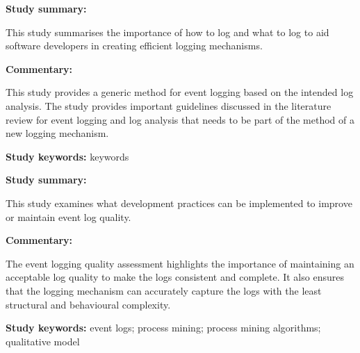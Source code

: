 \begin{tcolorbox}[colback=gray!5!white, colframe=deepblue!80!black, title=Learning to Log: Helping Developers Make Informed Logging Decisions \cite{Zhu2015}]
	\begin{minipage}[t]{0.25\textwidth}
		\textbf{Study summary:}
	\end{minipage}
	\hfill
	\begin{minipage}[t]{0.65\textwidth}
		This study summarises the importance of how to log and what to log to aid software developers in creating efficient logging mechanisms. 
	\end{minipage}

	\vspace{0.75em} 

	\begin{minipage}[t]{0.25\textwidth}
		\textbf{Commentary:}
	\end{minipage}
	\hfill
	\begin{minipage}[t]{0.65\textwidth}
		This study provides a generic method for event logging based on the intended log analysis. The study provides important guidelines discussed in the literature review for event logging and log analysis that needs to be part of the method of a new logging mechanism.
	\end{minipage}
	\tcblower
	\textbf{Study keywords:} keywords
\end{tcolorbox}

\begin{tcolorbox}[colback=gray!5!white, colframe=deepblue!80!black, title=Towards a better assessment of event logs quality\cite{Kherbouche2017}]
	\begin{minipage}[t]{0.25\textwidth}
		\textbf{Study summary:}
	\end{minipage}
	\hfill
	\begin{minipage}[t]{0.65\textwidth}
		This study examines what development practices can be implemented to improve or maintain event log quality.
	\end{minipage}

	\vspace{0.75em} 

	\begin{minipage}[t]{0.25\textwidth}
		\textbf{Commentary:}
	\end{minipage}
	\hfill
	\begin{minipage}[t]{0.65\textwidth}
		The event logging quality assessment highlights the importance of maintaining an acceptable log quality to make the logs consistent and complete. It also ensures that the logging mechanism can accurately capture the logs with the least structural and behavioural complexity. 
	\end{minipage}
	\tcblower
	\textbf{Study keywords:} event logs; process mining; process mining algorithms; qualitative model
\end{tcolorbox}


